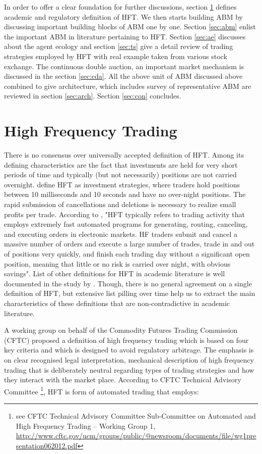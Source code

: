 \documentclass[12pt,a4paper]{article}
\numberwithin{equation}{section}
\numberwithin{figure}{section}
\numberwithin{table}{section}
\begin{document}
In order to offer a clear foundation for further discussions, section \ref{sec:hft} defines academic and regulatory definition of HFT. We then starts building ABM by discussing important building blocks of ABM one by one. Section \ref{sec:abm} enlist the important ABM in literature pertaining to HFT. Section \ref{sec:ae} discusses about the agent ecology and section \ref{sec:ts} give a detail review of trading strategies employed by HFT with real example taken from various stock exchange. The continuous double auction, an important market mechanism is discussed in the section \ref{sec:cda}. All the above unit of ABM discussed above combined to give architecture, which includes survey of representative ABM are reviewed in section \ref{sec:arch}. Section \ref{sec:con} concludes.   

\section{High Frequency Trading}\label{sec:hft}
There is no consensus over universally accepted definition of HFT. Among its defining characteristics are the fact that investments are held for very short periods of time and typically (but not necessarily) positions are not carried overnight. \citet{kearns2010} define HFT as investment strategies, where traders hold positions between 10 milliseconds and 10 seconds and have no over-night positions. The rapid submission of cancellations and deletions is necessary to realize small profits per trade. According to \citet{cvitanic2010}, "HFT typically refers to trading activity that employs extremely fast automated programs for generating, routing, canceling, and executing orders in electronic markets. HF traders submit and cancel a massive number of orders and execute a large number of trades, trade in and out of positions very quickly, and finish each trading day without a significant open position, meaning that little or no risk is carried over night, with obvious savings". List of other definitions for HFT in academic literature is well documented in the study by \citet{arndt2011}. Though, there is no general agreement on a single definition of HFT, but extensive list pilling over time help us to extract the main characteristics of these definitions that are non-contradictive in academic literature.

A working group on behalf of the Commodity Futures Trading Commission (CFTC) proposed a definition of high frequency trading which is based on four key criteria and which is designed to avoid regulatory arbitrage. The emphasis is on clear recognised legal interpretation, mechanical description of high frequency trading that is deliberately neutral regarding types of trading strategies and how they interact with the market place. According to CFTC Technical Advisory Committee \footnote{see CFTC Technical Advisory Committee Sub-Committee on Automated and High Frequency Trading – Working Group 1, \url {http://www.cftc.gov/ucm/groups/public/@newsroom/documents/file/wg1presentation062012.pdf}}, HFT is form of automated trading that employs:
\end{document}
